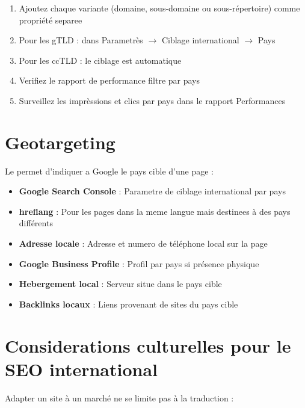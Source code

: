 \begin{enumerate}
    \item Ajoutez chaque variante (domaine, sous-domaine ou sous-répertoire) comme propriété separee
    \item Pour les gTLD : dans Parametrès $\rightarrow$ Ciblage international $\rightarrow$ Pays
    \item Pour les ccTLD : le ciblage est automatique
    \item Verifiez le rapport de performance filtre par pays
    \item Surveillez les imprèssions et clics par pays dans le rapport Performances
\end{enumerate}

\section{Geotargeting}

Le  permet d'indiquer a Google le pays cible d'une page :

\begin{itemize}
    \item \textbf{Google Search Console} : Parametre de ciblage international par pays
    \item \textbf{hreflang} : Pour les pages dans la meme langue mais destinees à des pays différents
    \item \textbf{Adresse locale} : Adresse et numero de téléphone local sur la page
    \item \textbf{Google Business Profile} : Profil par pays si présence physique
    \item \textbf{Hebergement local} : Serveur situe dans le pays cible
    \item \textbf{Backlinks locaux} : Liens provenant de sites du pays cible
\end{itemize}

\section{Considerations culturelles pour le SEO international}

Adapter un site à un marché ne se limite pas à la traduction :

